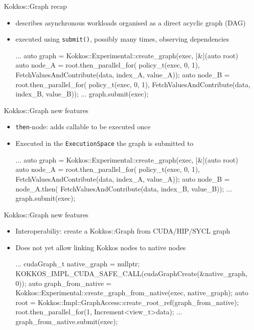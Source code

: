 \begin{frame}[fragile]{Kokkos::Graph recap}
 \begin{itemize}
     \item describes asynchronous workloads organised as a direct acyclic graph (DAG)
     \item executed using \texttt{submit()}, possibly many times, observing dependencies
      \begin{code}[keywords={auto}]
    ...
    auto graph = Kokkos::Experimental::create_graph(exec, [&](auto root) {
      auto node_A = root.then_parallel_for(
                    policy_t(exec, 0, 1),
                    FetchValuesAndContribute(data, index_A, value_A));
      auto node_B = root.then_parallel_for(
                    policy_t(exec, 0, 1),
                    FetchValuesAndContribute(data, index_B, value_B));}
    ...
    graph.submit(exec);
     \end{code}
 \end{itemize}
\end{frame}

\begin{frame}[fragile]{Kokkos::Graph new features}
 \begin{itemize}
   \item \texttt{then}-node: adds callable to be executed once
   \item Executed in the \texttt{ExecutionSpace} the graph is submitted to
     \begin{code}[keywords={auto}]
    ...
    auto graph = Kokkos::Experimental::create_graph(exec, [&](auto root) {
      auto node_A = root.then_parallel_for(
                    policy_t(exec, 0, 1),
                    FetchValuesAndContribute(data, index_A, value_A));
      auto node_B = node_A.then(
                    FetchValuesAndContribute(data, index_B, value_B));}
    ...
    graph.submit(exec);
     \end{code}
 \end{itemize}
\end{frame}

\begin{frame}[fragile]{Kokkos::Graph new features}
 \begin{itemize}
   \item Interoperabiliy: create a Kokkos::Graph from CUDA/HIP/SYCL graph
   \item Does not yet allow linking Kokkos nodes to native nodes
     \begin{code}[keywords={auto}]
    ...
    cudaGraph_t native_graph = nullptr;
    KOKKOS_IMPL_CUDA_SAFE_CALL(cudaGraphCreate(&native_graph, 0));
    auto graph_from_native =
      Kokkos::Experimental::create_graph_from_native(exec, native_graph);
    auto root = Kokkos::Impl::GraphAccess::create_root_ref(graph_from_native);
    root.then_parallel_for(1, Increment<view_t>{data});
    ...
    graph_from_native.submit(exec);
     \end{code}
 \end{itemize}
\end{frame}

